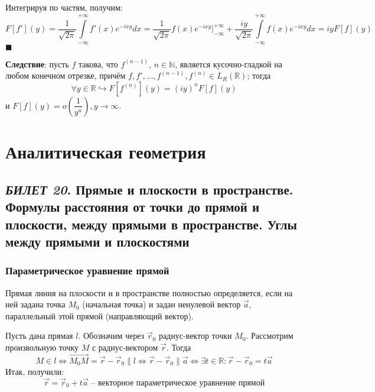 \documentclass[12pt, a4paper, reqno]{article}
\begin{document}
    Интегрируя по частям, получим:
    \begin{equation*}
        F[f'](y) = \frac{1}{\sqrt{2\pi}}\int\limits_{-\infty}^{+\infty} f'(x)e^{-ixy}dx =
        \frac{1}{\sqrt{2\pi}}f(x)e^{-ixy}\Big|_{-\infty}^{+\infty} +
        \frac{iy}{\sqrt{2\pi}}\int\limits_{-\infty}^{+\infty} f(x)e^{-ixy}dx = iyF[f](y)
    \end{equation*}
    $\blacksquare$

    \textbf{Следствие}: пусть $f$ такова, что $f^{(n - 1)}$, $n \in \mathbb{N}$, является
    кусочно-гладкой на любом конечном отрезке, причём
    $f, f', \ldots, f^{(n - 1)}, f^{(n)} \in L_R(\mathbb{R})$; тогда
    \begin{equation*}
        \forall y \in \mathbb{R} \hookrightarrow F[f^{(n)}](y) = (iy)^n F[f](y)
    \end{equation*}
    и $F[f](y) = o\left(\dfrac{1}{y^n}\right), y \to \infty$.

\newpage
\section{Аналитическая геометрия}

\subsection{\textit{БИЛЕТ 20}. Прямые и плоскости в пространстве. Формулы расстояния от точки до
            прямой и плоскости, между прямыми в пространстве. Углы между прямыми и плоскостями}

    \subsubsection{Параметрическое уравнение прямой}

    Прямая линия на плоскости и в пространстве полностью определяется, если на ней задана точка $M_0$
    (начальная точка) и задан ненулевой вектор $\vec{a}$, параллельный этой прямой (направляющий
    вектор).

    Пусть дана прямая $l$. Обозначим через $\vec{r}_0$ радиус-вектор точки $M_0$. Рассмотрим
    произвольную точку $M$ с радиус-вектором $\vec{r}$. Тогда
    \begin{equation*}
        M \in l \iff
        \overrightarrow{M_0M} = \vec{r} - \vec{r}_0 \parallel l \iff
        \vec{r} - \vec{r}_0 \parallel \vec{a} \iff
        \exists t \in \mathbb{R}: \vec{r} - \vec{r}_0 = t\vec{a}
    \end{equation*}
    Итак, получили:
    \begin{equation*}
        \boxed{\vec{r} = \vec{r}_0 + t\vec{a}}\text{ -- векторное параметрическое уравнение прямой}
    \end{equation*}
\end{document}
